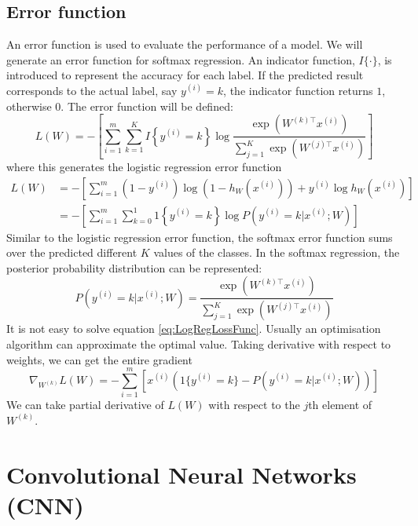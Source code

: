 \subsection{Error function}
An error function is used to evaluate the performance of a model. We will generate an error function for softmax regression. An indicator function, $I\{\cdot\}$, is introduced to represent the accuracy for each label. If the predicted result corresponds to the actual label, say $y^{(i)} = k$, the indicator function returns $1$, otherwise $0$. The error function will be defined:
\begin{equation}\label{eq:LogLossFunc}
L(W) = - \left[ \sum_{i=1}^{m} \sum_{k=1}^{K}  I\left\{y^{(i)} = k\right\} \log \frac{\exp(W^{(k)\top} x^{(i)})}{\sum_{j=1}^K \exp(W^{(j)\top} x^{(i)})}\right]
\end{equation}
where this generates the logistic regression error function
\begin{align}\label{eq:LogRegLossFunc}
L(W) &= - \left[ \sum_{i=1}^m   (1-y^{(i)}) \log (1-h_W(x^{(i)})) + y^{(i)} \log h_W(x^{(i)}) \right] \\
&= - \left[ \sum_{i=1}^{m} \sum_{k=0}^{1} 1\left\{y^{(i)} = k\right\} \log P(y^{(i)} = k | x^{(i)} ; W) \right]
\end{align}
Similar to the logistic regression error function, the softmax error function sums over the predicted different $K$ values of the classes. In the softmax regression, the posterior probability distribution can be represented:
\begin{equation}\label{eq:PostProbDis}
P(y^{(i)} = k | x^{(i)} ; W) = \frac{\exp(W^{(k)\top} x^{(i)})}{\sum_{j=1}^K \exp(W^{(j)\top} x^{(i)}) }
\end{equation}
It is not easy to solve equation \ref{eq:LogRegLossFunc}. Usually an optimisation algorithm can approximate the optimal value. Taking derivative with respect to weights, we can get the entire gradient 
\begin{equation}\label{eq:PartDer}
\nabla_{W^{(k)}} L(W) = - \sum_{i=1}^{m}{ \left[ x^{(i)} \left( 1\{ y^{(i)} = k\}  - P(y^{(i)} = k | x^{(i)}; W) \right) \right]  }
\end{equation}
We can take partial derivative of $L(W)$ with respect to the $j$th element of $W^{(k)}$.

\section{Convolutional Neural Networks (CNN)}

